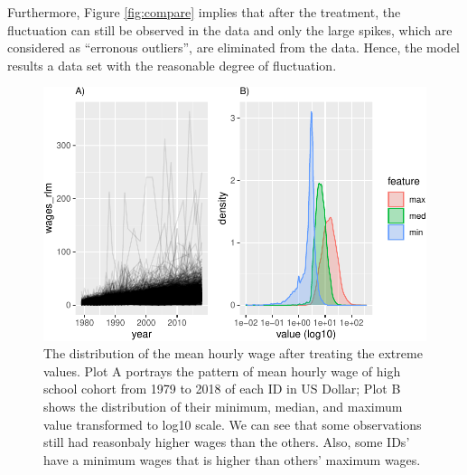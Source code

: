 Furthermore, Figure \ref{fig:compare} implies that after the treatment,
the fluctuation can still be observed in the data and only the large
spikes, which are considered as ``erronous outliers'', are eliminated
from the data. Hence, the model results a data set with the reasonable
degree of fluctuation.

\begin{Schunk}
\begin{figure}
\includegraphics{figures/comppict-1} \caption[The distribution of the mean hourly wage after treating the extreme values]{The distribution of the mean hourly wage after treating the extreme values. Plot A portrays the pattern of mean hourly wage of high school cohort from 1979 to 2018 of each ID in US Dollar; Plot B shows the distribution of their minimum, median, and maximum value transformed to log10 scale. We can see that some observations still had reasonbaly higher wages than the others. Also, some IDs' have a minimum wages that is higher than others' maximum wages.}\label{fig:comppict}
\end{figure}
\end{Schunk}

